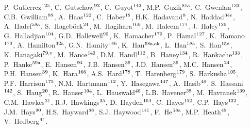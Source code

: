 \begin{flushleft}
P.~Gutierrez$^\textrm{\scriptsize 125}$,    
C.~Gutschow$^\textrm{\scriptsize 92}$,    
C.~Guyot$^\textrm{\scriptsize 142}$,    
M.P.~Guzik$^\textrm{\scriptsize 81a}$,    
C.~Gwenlan$^\textrm{\scriptsize 132}$,    
C.B.~Gwilliam$^\textrm{\scriptsize 88}$,    
A.~Haas$^\textrm{\scriptsize 122}$,    
C.~Haber$^\textrm{\scriptsize 18}$,    
H.K.~Hadavand$^\textrm{\scriptsize 8}$,    
N.~Haddad$^\textrm{\scriptsize 34e}$,    
A.~Hadef$^\textrm{\scriptsize 58a}$,    
S.~Hageb\"ock$^\textrm{\scriptsize 24}$,    
M.~Hagihara$^\textrm{\scriptsize 166}$,    
M.~Haleem$^\textrm{\scriptsize 174}$,    
J.~Haley$^\textrm{\scriptsize 126}$,    
G.~Halladjian$^\textrm{\scriptsize 104}$,    
G.D.~Hallewell$^\textrm{\scriptsize 99}$,    
K.~Hamacher$^\textrm{\scriptsize 179}$,    
P.~Hamal$^\textrm{\scriptsize 127}$,    
K.~Hamano$^\textrm{\scriptsize 173}$,    
A.~Hamilton$^\textrm{\scriptsize 32a}$,    
G.N.~Hamity$^\textrm{\scriptsize 146}$,    
K.~Han$^\textrm{\scriptsize 58a,ak}$,    
L.~Han$^\textrm{\scriptsize 58a}$,    
S.~Han$^\textrm{\scriptsize 15d}$,    
K.~Hanagaki$^\textrm{\scriptsize 79,v}$,    
M.~Hance$^\textrm{\scriptsize 143}$,    
D.M.~Handl$^\textrm{\scriptsize 112}$,    
B.~Haney$^\textrm{\scriptsize 134}$,    
R.~Hankache$^\textrm{\scriptsize 133}$,    
P.~Hanke$^\textrm{\scriptsize 59a}$,    
E.~Hansen$^\textrm{\scriptsize 94}$,    
J.B.~Hansen$^\textrm{\scriptsize 39}$,    
J.D.~Hansen$^\textrm{\scriptsize 39}$,    
M.C.~Hansen$^\textrm{\scriptsize 24}$,    
P.H.~Hansen$^\textrm{\scriptsize 39}$,    
K.~Hara$^\textrm{\scriptsize 166}$,    
A.S.~Hard$^\textrm{\scriptsize 178}$,    
T.~Harenberg$^\textrm{\scriptsize 179}$,    
S.~Harkusha$^\textrm{\scriptsize 105}$,    
P.F.~Harrison$^\textrm{\scriptsize 175}$,    
N.M.~Hartmann$^\textrm{\scriptsize 112}$,    
Y.~Hasegawa$^\textrm{\scriptsize 147}$,    
A.~Hasib$^\textrm{\scriptsize 48}$,    
S.~Hassani$^\textrm{\scriptsize 142}$,    
S.~Haug$^\textrm{\scriptsize 20}$,    
R.~Hauser$^\textrm{\scriptsize 104}$,    
L.~Hauswald$^\textrm{\scriptsize 46}$,    
L.B.~Havener$^\textrm{\scriptsize 38}$,    
M.~Havranek$^\textrm{\scriptsize 139}$,    
C.M.~Hawkes$^\textrm{\scriptsize 21}$,    
R.J.~Hawkings$^\textrm{\scriptsize 35}$,    
D.~Hayden$^\textrm{\scriptsize 104}$,    
C.~Hayes$^\textrm{\scriptsize 152}$,    
C.P.~Hays$^\textrm{\scriptsize 132}$,    
J.M.~Hays$^\textrm{\scriptsize 90}$,    
H.S.~Hayward$^\textrm{\scriptsize 88}$,    
S.J.~Haywood$^\textrm{\scriptsize 141}$,    
F.~He$^\textrm{\scriptsize 58a}$,    
M.P.~Heath$^\textrm{\scriptsize 48}$,    
V.~Hedberg$^\textrm{\scriptsize 94}$,    

\end{flushleft}
